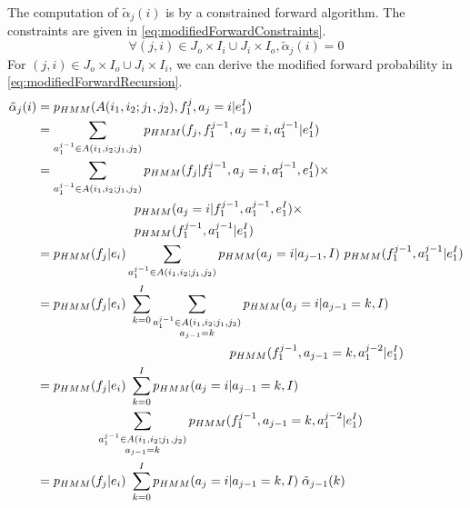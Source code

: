 %
The computation of $\tilde{\alpha}_j(i)$ is by a constrained forward algorithm.
The constraints are given in \autoref{eq:modifiedForwardConstraints}.
%
\begin{equation}
  \forall (j, i) \in J_o \times I_i \cup J_i \times I_o, \tilde \alpha_j(i) = 0
  \label{eq:modifiedForwardConstraints}
\end{equation}
%
For $(j, i) \in J_o \times I_o \cup J_i \times I_i$, we can derive the modified
forward probability in \autoref{eq:modifiedForwardRecursion}.
%
\begin{align}
  \tilde{\alpha}_j(i) &= p_{HMM}(A(i_1, i_2; j_1, j_2), f_1^j, a_j=i | e_1^I) \nonumber \\
                      &= \sum_{a_1^{j-1} \in A(i_1, i_2; j_1, j_2)}
                         p_{HMM}(f_j, f_1^{j-1},  a_j=i, a_1^{j-1} | e_1^I) \nonumber \\
                      &= \sum_{a_1^{j-1} \in A(i_1, i_2; j_1, j_2)}
                         p_{HMM}(f_j | f_1^{j-1},  a_j=i, a_1^{j-1}, e_1^I) \times \nonumber \\
                      & \hspace{7.7em} p_{HMM}(a_j=i | f_1^{j-1}, a_1^{j-1}, e_1^I) \times \nonumber \\
                      & \hspace{7.7em} p_{HMM}(f_1^{j-1}, a_1^{j-1} | e_1^I) \nonumber \\
                      &= p_{HMM}( f_j | e_i ) 
                         \sum_{a_1^{j-1} \in A(i_1, i_2; j_1, j_2)}
                         p_{HMM}(a_j=i | a_{j-1}, I) \
                         p_{HMM}(f_1^{j-1},  a_1^{j-1} | e_1^I) \nonumber \\
                      &= p_{HMM}(f_j | e_i) \
                         \sum_{k=0}^I \sum_{\substack{a_1^{j-1} \in A(i_1, i_2; j_1, j_2) \\ a_{j-1} = k}}
                         p_{HMM}(a_j=i | a_{j-1} = k, I) \nonumber \\
                      & \hspace{15.2em} p_{HMM}(f_1^{j-1},  a_{j-1} = k,  a_1^{j-2} | e_1^I) \nonumber \\
                      &= p_{HMM}(f_j | e_i) \
                         \sum_{k = 0}^I
                         p_{HMM}(a_j = i | a_{j-1} = k, I) \nonumber \\
                      & \hspace{4.7em} \sum_{\substack{a_1^{j-1} \in A(i_1, i_2; j_1, j_2) \\ a_{j-1} = k}}
                         p_{HMM}(f_1^{j-1},  a_{j-1} = k,  a_1^{j-2} | e_1^I) \nonumber \\
                      &= p_{HMM}(f_j | e_i) \
                         \sum_{k = 0}^I
                         p_{HMM}(a_j=i | a_{j-1} = k, I) \; \tilde \alpha_{j-1}(k)
                         \label{eq:modifiedForwardRecursion}
\end{align}
